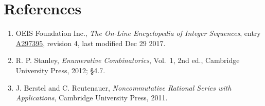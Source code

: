 \documentclass[11pt]{article}
\theoremstyle{definition}
\begin{document}
\section{References}

\begin{enumerate}

\item OEIS Foundation Inc., \emph{The On-Line Encyclopedia of Integer Sequences}, entry \href{https://oeis.org/A297395}{A297395}, revision 4, last modified Dec 29 2017.

\item R. P. Stanley, \emph{Enumerative Combinatorics}, Vol.~1, 2nd ed., Cambridge University Press, 2012; \S4.7.

\item J. Berstel and C. Reutenauer, \emph{Noncommutative Rational Series with Applications}, Cambridge University Press, 2011.

\end{enumerate}
\end{document}
